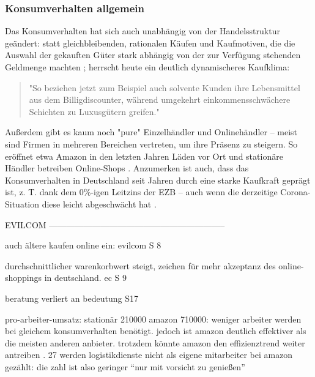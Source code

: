 \begin{folding} \subsubsection{Konsumverhalten allgemein}

Das Konsumverhalten hat sich auch unabhängig von der Handelsstruktur geändert: statt gleichbleibenden, rationalen Käufen und Kaufmotiven, die die Auswahl der gekauften Güter stark abhängig von der zur Verfügung stehenden Geldmenge machten \cite[S. 38]{Schramm}; herrscht heute ein deutlich dynamischeres Kaufklima:
\begin{quote}
"So beziehen jetzt zum Beispiel auch solvente Kunden ihre Lebensmittel aus dem Billigdiscounter, während  umgekehrt  einkommensschwächere  Schichten  zu  Luxusgütern  greifen." \cite[S. 43]{Nitt}
\end{quote}
Außerdem gibt es kaum noch "pure" Einzelhändler und Onlinehändler – meist sind Firmen in mehreren Bereichen vertreten, um ihre Präsenz zu steigern. So eröffnet etwa Amazon in den letzten Jahren Läden vor Ort und stationäre Händler betreiben Online-Shops \cite[S. 50]{Graf}.
Anzumerken ist auch, dass das Konsumverhalten in Deutschland seit Jahren durch eine starke Kaufkraft geprägt ist, z. T. dank dem 0\%-igen Leitzins der \ac{EZB} \cite[S. 49]{Ebert} – auch wenn die derzeitige Corona-Situation diese leicht abgeschwächt hat \cite{BfWE}. 

\end{folding}



\iffalse 

        EVILCOM --------------------------------------------------------------
        
        auch ältere kaufen online ein: evilcom S 8
        
        durchschnittlicher warenkorbwert steigt, zeichen für mehr akzeptanz des online-shoppings in deutschland. ec S 9
        
        beratung verliert an bedeutung S17
        
        pro-arbeiter-umsatz: stationär 210000 amazon 710000: weniger arbeiter werden bei gleichem konsumverhalten benötigt. jedoch ist amazon deutlich effektiver als die meisten anderen anbieter. trotzdem könnte amazon den effizienztrend weiter antreiben \s. 27 werden logistikdienste nicht als eigene mitarbeiter bei amazon gezählt: die zahl ist also geringer ``nur mit vorsicht zu genießen''
        
